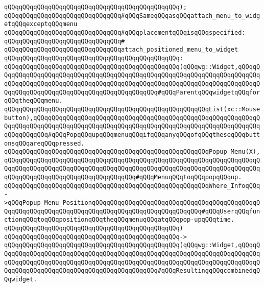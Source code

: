 \verb|qQQqqQQqqQQqqQQqqQQqqQQqqQQqqQQqqQQqqQQqqQQqqQQq);|\newline
\newline
\verb|qQQqqQQqqQQqqQQqqQQqqQQqqQQqqQQq#qQQqSameqQQqasqQQqattach_menu_to_widgetqQQqexceptqQQqmenu|\newline
\verb|qQQqqQQqqQQqqQQqqQQqqQQqqQQqqQQq#qQQqplacementqQQqisqQQqspecified:|\newline
\verb|qQQqqQQqqQQqqQQqqQQqqQQqqQQqqQQq#|\newline
\verb|qQQqqQQqqQQqqQQqqQQqqQQqqQQqqQQqattach_positioned_menu_to_widget|\newline
\verb|qQQqqQQqqQQqqQQqqQQqqQQqqQQqqQQqqQQqqQQqqQQqqQQq:|\newline
\verb|qQQqqQQqqQQqqQQqqQQqqQQqqQQqqQQqqQQqqQQqqQQqqQQq(qQQqwg::Widget,qQQqqQQqqQQqqQQqqQQqqQQqqQQqqQQqqQQqqQQqqQQqqQQqqQQqqQQqqQQqqQQqqQQqqQQqqQQqqQQqqQQqqQQqqQQqqQQqqQQqqQQqqQQqqQQqqQQqqQQqqQQqqQQqqQQqqQQqqQQqqQQqqQQqqQQqqQQqqQQqqQQqqQQqqQQqqQQqqQQqqQQqqQQq#qQQqParentqQQqwidgetqQQqforqQQqtheqQQqmenu.|\newline
\verb|qQQqqQQqqQQqqQQqqQQqqQQqqQQqqQQqqQQqqQQqqQQqqQQqqQQqqQQqList(xc::Mousebutton),qQQqqQQqqQQqqQQqqQQqqQQqqQQqqQQqqQQqqQQqqQQqqQQqqQQqqQQqqQQqqQQqqQQqqQQqqQQqqQQqqQQqqQQqqQQqqQQqqQQqqQQqqQQqqQQqqQQqqQQqqQQqqQQqqQQqqQQqqQQqqQQq#qQQqPopqQQqupqQQqmenuqQQqifqQQqanyqQQqofqQQqtheseqQQqbuttonsqQQqareqQQqpressed.|\newline
\verb|qQQqqQQqqQQqqQQqqQQqqQQqqQQqqQQqqQQqqQQqqQQqqQQqqQQqqQQqPopup_Menu(X),qQQqqQQqqQQqqQQqqQQqqQQqqQQqqQQqqQQqqQQqqQQqqQQqqQQqqQQqqQQqqQQqqQQqqQQqqQQqqQQqqQQqqQQqqQQqqQQqqQQqqQQqqQQqqQQqqQQqqQQqqQQqqQQqqQQqqQQqqQQqqQQqqQQqqQQqqQQqqQQqqQQqqQQqqQQqqQQq#qQQqMenuqQQqtoqQQqpopqQQqup.|\newline
\verb|qQQqqQQqqQQqqQQqqQQqqQQqqQQqqQQqqQQqqQQqqQQqqQQqqQQqqQQqWhere_InfoqQQq->qQQqPopup_Menu_PositionqQQqqQQqqQQqqQQqqQQqqQQqqQQqqQQqqQQqqQQqqQQqqQQqqQQqqQQqqQQqqQQqqQQqqQQqqQQqqQQqqQQqqQQqqQQqqQQqqQQq#qQQqUserqQQqfunctionqQQqtoqQQqpositionqQQqtheqQQqmenuqQQqatqQQqpop-upqQQqtime.|\newline
\verb|qQQqqQQqqQQqqQQqqQQqqQQqqQQqqQQqqQQqqQQqqQQqqQQq)|\newline
\verb|qQQqqQQqqQQqqQQqqQQqqQQqqQQqqQQqqQQqqQQqqQQqqQQq->|\newline
\verb|qQQqqQQqqQQqqQQqqQQqqQQqqQQqqQQqqQQqqQQqqQQqqQQq(qQQqwg::Widget,qQQqqQQqqQQqqQQqqQQqqQQqqQQqqQQqqQQqqQQqqQQqqQQqqQQqqQQqqQQqqQQqqQQqqQQqqQQqqQQqqQQqqQQqqQQqqQQqqQQqqQQqqQQqqQQqqQQqqQQqqQQqqQQqqQQqqQQqqQQqqQQqqQQqqQQqqQQqqQQqqQQqqQQqqQQqqQQqqQQqqQQqqQQq#qQQqResultingqQQqcombinedqQQqwidget.|\newline
